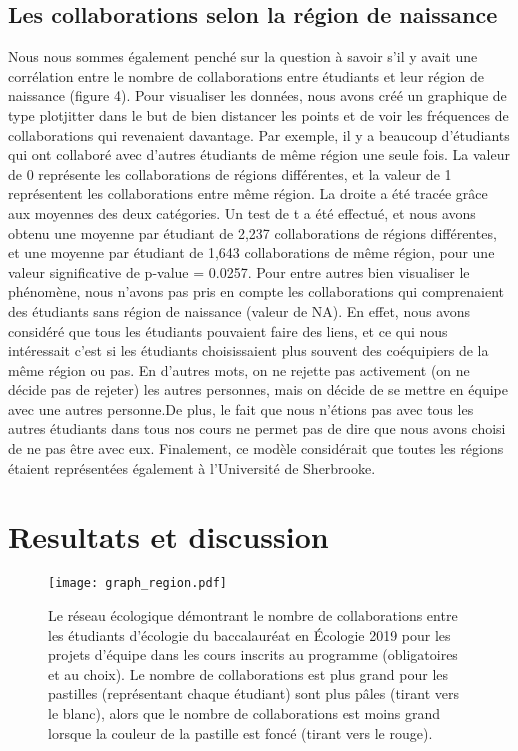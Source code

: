 \documentclass[twoside,twocolumn]{article}
\begin{document}
\subsection{Les collaborations selon la région de naissance}

Nous nous sommes également penché sur la question à savoir s’il y avait une corrélation entre le nombre de collaborations entre étudiants et leur région de naissance (figure 4). Pour visualiser les données, nous avons créé un graphique de type plotjitter dans le but de bien distancer les points et de voir les fréquences de collaborations qui revenaient davantage. Par exemple, il y a beaucoup d’étudiants qui ont collaboré avec d’autres étudiants de même région une seule fois. La valeur de 0 représente les collaborations de régions différentes, et la valeur de 1 représentent les collaborations entre même région. La droite a été tracée grâce aux moyennes des deux catégories. Un test de t a été effectué, et nous avons obtenu une moyenne par étudiant de 2,237 collaborations de régions différentes, et une moyenne par étudiant de 1,643 collaborations de même région, pour une valeur significative de p-value = 0.0257. Pour entre autres bien visualiser le phénomène, nous n’avons pas pris en compte les collaborations qui comprenaient des étudiants sans région de naissance (valeur de NA). En effet, nous avons considéré que tous les étudiants pouvaient faire des liens, et ce qui nous intéressait c’est si les étudiants choisissaient plus souvent des coéquipiers de la même région ou pas. En d’autres mots, on ne rejette pas activement (on ne décide pas de rejeter) les autres personnes, mais on décide de se mettre en équipe avec une autres personne.De plus, le fait que nous n'étions pas avec tous les autres étudiants dans tous nos cours ne permet pas de dire que nous avons choisi de ne pas être avec eux. Finalement, ce modèle considérait que toutes les régions étaient représentées également à l’Université de Sherbrooke.



\section{Resultats et discussion}


\begin{figure}[h]
\texttt{[image: graph\_region.pdf]}
\caption{Le réseau écologique démontrant le nombre de collaborations entre les étudiants d’écologie du baccalauréat en Écologie 2019 pour les projets d’équipe dans les cours inscrits au programme (obligatoires et au choix). Le nombre de collaborations est plus grand pour les pastilles (représentant chaque étudiant) sont plus pâles (tirant vers le blanc), alors que le nombre de collaborations est moins grand lorsque la couleur de la pastille est foncé (tirant vers le rouge).}
\end{figure}
\end{document}

